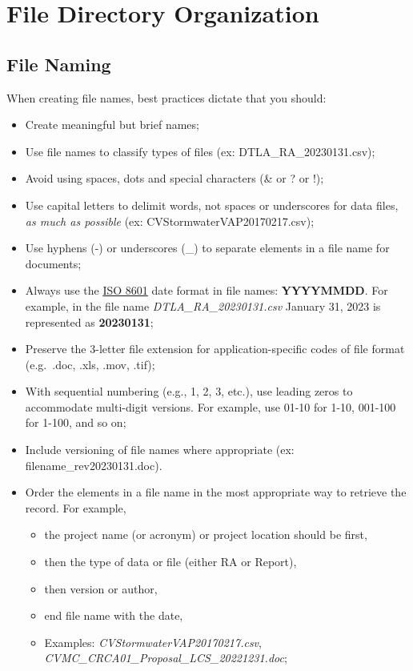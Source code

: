 \documentclass[
]{book}
\providecommand{\tightlist}{%
  \setlength{\itemsep}{0pt}\setlength{\parskip}{0pt}}
\begin{document}
\hypertarget{organization}{%
\chapter{File Directory Organization}\label{organization}}

\hypertarget{file-naming}{%
\section{File Naming}\label{file-naming}}

When creating file names, best practices dictate that you should:

\begin{itemize}
\item
  Create meaningful but brief names;
\item
  Use file names to classify types of files (ex: DTLA\_RA\_20230131.csv);
\item
  Avoid using spaces, dots and special characters (\& or ? or !);
\item
  Use capital letters to delimit words, not spaces or underscores for data files, \emph{as much as possible} (ex: CVStormwaterVAP20170217.csv);
\item
  Use hyphens (-) or underscores (\_) to separate elements in a file name for documents;
\item
  Always use the \href{https://www.iso.org/iso-8601-date-and-time-format.html}{ISO 8601} date format in file names: \textbf{YYYYMMDD}. For example, in the file name \emph{DTLA\_RA\_20230131.csv} January 31, 2023 is represented as \textbf{20230131};
\item
  Preserve the 3-letter file extension for application-specific codes of file format (e.g.~.doc, .xls, .mov, .tif);
\item
  With sequential numbering (e.g., 1, 2, 3, etc.), use leading zeros to accommodate multi-digit versions. For example, use 01-10 for 1-10, 001-100 for 1-100, and so on;
\item
  Include versioning of file names where appropriate (ex: filename\_rev20230131.doc).
\item
  Order the elements in a file name in the most appropriate way to retrieve the record. For example,

  \begin{itemize}
  \tightlist
  \item
    the project name (or acronym) or project location should be first,
  \item
    then the type of data or file (either RA or Report),
  \item
    then version or author,
  \item
    end file name with the date,
  \item
    Examples: \emph{CVStormwaterVAP20170217.csv}, \emph{CVMC\_CRCA01\_Proposal\_LCS\_20221231.doc};
  \end{itemize}
\end{itemize}
\end{document}
